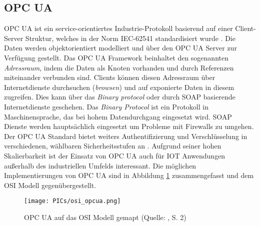 \documentclass[BMR,Bachelor,ngerman]{twbook}%
\begin{document}
\subsection{\acf{OPC UA}}
\ac{OPC UA} \cite{opcua} ist ein service-orientiertes Industrie-Protokoll basierend auf einer Client-Server Struktur, welches in der Norm IEC-62541 standardisiert wurde \cite{iec62541}. Die Daten werden objektorientiert modelliert und über den \ac{OPC UA} Server zur Verfügung gestellt. Das \ac{OPC UA} Framework beinhaltet den sogenannten \emph{Adressraum}, indem die Daten als Knoten vorhanden und durch Referenzen miteinander verbunden sind. Clients können diesen Adressraum über Internetdienste durchsuchen (\emph{browsen}) und auf exponierte Daten in diesem zugreifen. Dies kann über das \emph{Binary protocol} oder durch \ac{SOAP} basierende Internetdienste geschehen. Das \emph{Binary Protocol} ist ein Protokoll in Maschinensprache, das bei hohem Datendurchgang eingesetzt wird. \ac{SOAP} Dienste werden hauptsächlich eingesetzt um Probleme mit Firewalls zu umgehen. Der \ac{OPC UA} Standard bietet weiters Authentifizierung und Verschlüsselung in verschiedenen, wählbaren Sicherheitsstufen an \cite{palm2015open}. Aufgrund seiner hohen Skalierbarkeit ist der Einsatz von \ac{OPC UA} auch für \ac{IOT} Anwendungen außerhalb des industriellen Umfelds interessant. Die möglichen Implementierungen von \ac{OPC UA} sind in Abbildung \ref{fig:opcua} zusammengefasst und dem \ac{OSI} Modell gegenübergestellt.
\clearpage
\begin{figure}[!h]
\centering
\texttt{[image: PICs/osi\_opcua.png]}
\caption{\ac{OPC UA} auf das \ac{OSI} Modell gemapt (Quelle: \protect\cite{neumann2015opcua}, S. 2)}\label{fig:opcua}
\end{figure}
\end{document}

